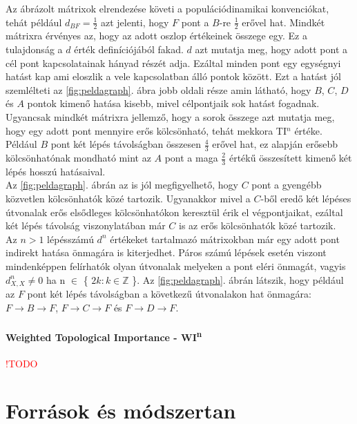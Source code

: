 \documentclass[a4paper,12pt]{article}
\begin{document}
	Az ábrázolt mátrixok elrendezése követi a populációdinamikai konvenciókat, tehát például $d_{BF}=\frac{1}{2}$ azt jelenti, hogy $F$ pont a $B$-re $\frac{1}{2}$ erővel hat. Mindkét mátrixra érvényes az, hogy az adott oszlop értékeinek összege egy. Ez a tulajdonság a $d$ érték definíciójából fakad. $d$ azt mutatja meg, hogy adott pont a cél pont kapcsolatainak hányad részét adja. Ezáltal minden pont egy egységnyi hatást kap ami eloszlik a vele kapcsolatban álló pontok között. \cite{ti} Ezt a hatást jól szemlélteti az \ref{fig:peldagraph}. ábra jobb oldali része amin látható, hogy $B$, $C$, $D$ és $A$ pontok kimenő hatása kisebb, mivel célpontjaik sok hatást fogadnak. \\
	\indent Ugyancsak mindkét mátrixra jellemző, hogy a sorok összege azt mutatja meg, hogy egy adott pont mennyire erős kölcsönható, tehát mekkora TI$^n$ értéke. Például $B$ pont két lépés távolságban összesen $\frac{4}{3}$ erővel hat, ez alapján erősebb kölcsönhatónak mondható mint az $A$ pont a maga $\frac{2}{3}$ értékű összesített kimenő két lépés hosszú hatásaival. \cite{ti} \\
	\indent Az \ref{fig:peldagraph}. ábrán az is jól megfigyelhető, hogy $C$ pont a gyengébb közvetlen kölcsönhatók közé tartozik. Ugyanakkor mivel a $C$-ből eredő két lépéses útvonalak erős elsődleges kölcsönhatókon keresztül érik el végpontjaikat, ezáltal két lépés távolság viszonylatában már $C$ is az erős kölcsönhatók közé tartozik. \\
	\indent Az $n > 1$ lépésszámú $d^n$ értékeket tartalmazó mátrixokban már egy adott pont indirekt hatása önmagára is kiterjedhet. Páros számú lépések esetén viszont mindenképpen felírhatók olyan útvonalak melyeken a pont eléri önmagát, \cite{ti} vagyis $d^n_{X,X} \neq 0$ ha n $\in$ \{ $2k :  k \in \mathbb{Z}$ \}. Az \ref{fig:peldagraph}. ábrán látszik, hogy például az $F$ pont két lépés távolságban a következű útvonalakon hat önmagára: $F \rightarrow B \rightarrow F$, $F \rightarrow C \rightarrow F$ és  $F \rightarrow D \rightarrow F$.
	
 	 \paragraph{Weighted Topological Importance - WI\textsuperscript{n}} \textcolor{red}{ !TODO}

\section{Források és módszertan}
\end{document}
